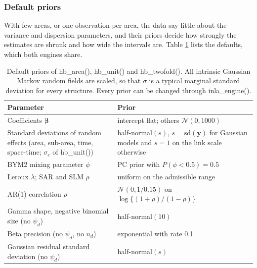\subsubsection{Default priors}\label{sec:methods-priors}

With few areas, or one observation per area, the data say little about the variance and dispersion parameters, and their priors decide how strongly the estimates are shrunk and how wide the intervals are. Table \ref{tab:priors} lists the defaults, which both engines share.

\begin{table}[!h]
\centering
\caption{\label{tab:priors}Default priors of hb\_area(), hb\_unit() and hb\_twofold(). All intrinsic Gaussian Markov random fields are scaled, so that $\sigma$ is a typical marginal standard deviation for every structure. Every prior can be changed through inla\_engine().}
\centering
\begin{tabular}[t]{>{\raggedright\arraybackslash}p{6cm}>{\raggedright\arraybackslash}p{8cm}}
\toprule
Parameter & Prior\\
\midrule
Coefficients $\boldsymbol{\beta}$ & intercept flat; others $\mathcal{N}(0, 1000)$\\
Standard deviations of random effects (area, sub-area, time, space-time; $\sigma_e$ of hb\_unit()) & half-normal$(s)$, $s = \mathrm{sd}(\boldsymbol{y})$ for Gaussian models and $s = 1$ on the link scale otherwise\\
BYM2 mixing parameter $\phi$ & PC prior with $P(\phi < 0.5) = 0.5$\\
Leroux $\lambda$; SAR and SLM $\rho$ & uniform on the admissible range\\
AR(1) correlation $\rho$ & $\mathcal{N}(0, 1/0.15)$ on $\log\{(1 + \rho)/(1 - \rho)\}$\\
Gamma shape, negative binomial size (no $\psi_d$) & half-normal$(10)$\\
Beta precision (no $\psi_d$, no $n_d$) & exponential with rate 0.1\\
Gaussian residual standard deviation (no $\psi_d$) & half-normal$(s)$\\
\bottomrule
\end{tabular}
\end{table}

